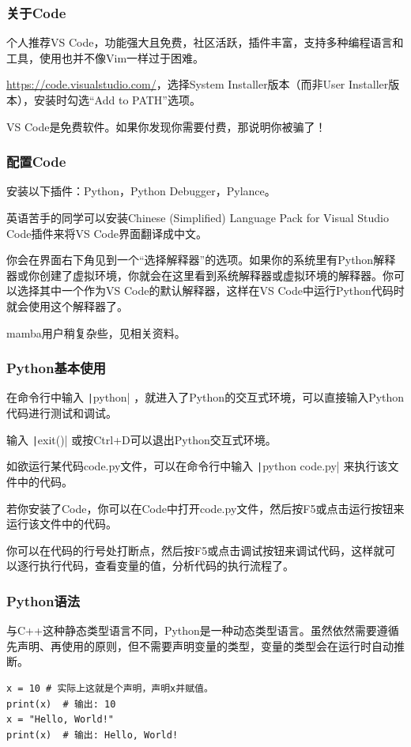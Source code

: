 \begin{frame}
    \frametitle{关于Code}

    个人推荐VS Code，功能强大且免费，社区活跃，插件丰富，支持多种编程语言和工具，使用也并不像Vim一样过于困难。

    \url{https://code.visualstudio.com/}，选择System Installer版本（而非User Installer版本），安装时勾选“Add to PATH”选项。

    \alert{VS Code是免费软件。如果你发现你需要付费，那说明你被骗了！}

\end{frame}

\begin{frame}
    \frametitle{配置Code}

    安装以下插件：Python，Python Debugger，Pylance。

    英语苦手的同学可以安装Chinese (Simplified) Language Pack for Visual Studio Code插件来将VS Code界面翻译成中文。

    你会在界面右下角见到一个“选择解释器”的选项。如果你的系统里有Python解释器或你创建了虚拟环境，你就会在这里看到系统解释器或虚拟环境的解释器。你可以选择其中一个作为VS Code的默认解释器，这样在VS Code中运行Python代码时就会使用这个解释器了。

    mamba用户稍复杂些，见相关资料。

\end{frame}

\begin{frame}
    \frametitle{Python基本使用}

    在命令行中输入 \texttt|python| ，就进入了Python的交互式环境，可以直接输入Python代码进行测试和调试。

    输入 \texttt|exit()| 或按Ctrl+D可以退出Python交互式环境。

    如欲运行某代码code.py文件，可以在命令行中输入 \texttt|python code.py| 来执行该文件中的代码。

    若你安装了Code，你可以在Code中打开code.py文件，然后按F5或点击运行按钮来运行该文件中的代码。

    你可以在代码的行号处打断点，然后按F5或点击调试按钮来调试代码，这样就可以逐行执行代码，查看变量的值，分析代码的执行流程了。

\end{frame}

\begin{frame}[fragile]
    \frametitle{Python语法}

    与C++这种静态类型语言不同，Python是一种动态类型语言。虽然依然需要遵循先声明、再使用的原则，但不需要声明变量的类型，变量的类型会在运行时自动推断。
    \begin{verbatim}
x = 10 # 实际上这就是个声明，声明x并赋值。
print(x)  # 输出: 10
x = "Hello, World!"
print(x)  # 输出: Hello, World!
    \end{verbatim}

\end{frame}

